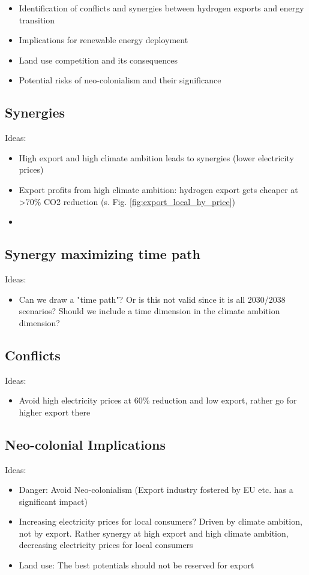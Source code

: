 \begin{itemize}
    \item Identification of conflicts and synergies between hydrogen exports and energy transition
    \item Implications for renewable energy deployment
    \item Land use competition and its consequences
    \item Potential risks of neo-colonialism and their significance
\end{itemize}


\subsection{Synergies}
Ideas:
\begin{itemize}
    \item High export and high climate ambition leads to synergies (lower electricity prices)
    \item Export profits from high climate ambition: hydrogen export gets cheaper at >70\% CO2 reduction (s. Fig. \ref{fig:export_local_hy_price})
    \item 
\end{itemize}

\subsection{Synergy maximizing time path}
Ideas:
\begin{itemize}
    \item Can we draw a "time path"? Or is this not valid since it is all 2030/2038 scenarios? Should we include a time dimension in the climate ambition dimension?
\end{itemize}

\subsection{Conflicts}
Ideas:
\begin{itemize}
    \item Avoid high electricity prices at 60\% reduction and low export, rather go for higher export there
\end{itemize}

\subsection{Neo-colonial Implications}
Ideas:
\begin{itemize}
    \item Danger: Avoid Neo-colonialism (Export industry fostered by EU etc. has a significant impact)
    \item Increasing electricity prices for local consumers? Driven by climate ambition, not by export. Rather synergy at high export and high climate ambition, decreasing electricity prices for local consumers
    \item Land use: The best potentials should not be reserved for export
\end{itemize}



